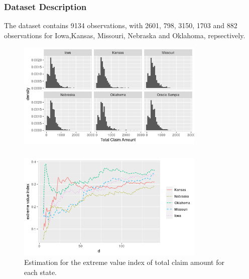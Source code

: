 \documentclass{beamer}
\begin{document}
\begin{frame}
    \frametitle{Dataset Description}
    The dataset contains 9134 observations, with 2601, 798, 3150, 1703 and 882 observations for Iowa,Kansas, Missouri, Nebraska and Oklahoma, repsectively. 
    \begin{figure}[htbp]
        \centering
          \includegraphics[width=0.8\textwidth]{histogram_full_data.png} 
      \end{figure}

\end{frame}

\begin{frame}
    \frametitle{}
    \begin{figure}[htbp]
        \centering
          \includegraphics[width=0.8\textwidth]{gamma_state.png}
        \caption{Estimation for the extreme value index of total claim amount for each state.}
        \label{figure Insurance_example_gamma_state}
      \end{figure}
    
\end{frame}
\end{document}
